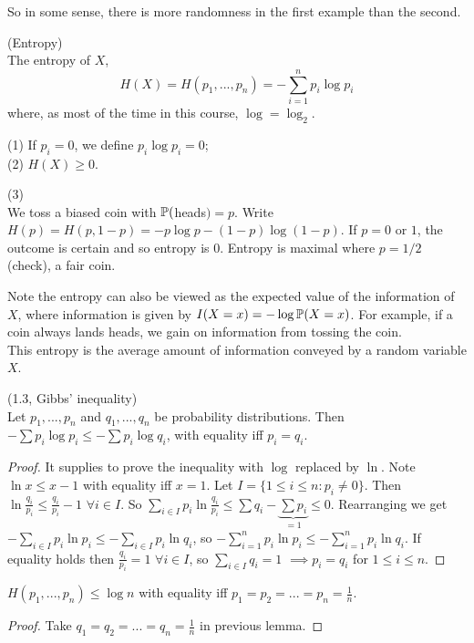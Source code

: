 \documentclass[a4paper]{article}
\begin{document}
So in some sense, there is more randomness in the first example than the second.

\begin{defi} (Entropy)\\
The entropy of $X$, $$H(X) = H(p_1,...,p_n) = -\sum_{i=1}^n p_i \log p_i$$ where, as most of the time in this course, $\log = \log_2$.
\end{defi}

\begin{rem}
(1) If $p_i = 0$, we define $p_i \log p_i = 0$;\\
(2) $H(X) \geq 0$.
\end{rem}

\begin{eg} (3)\\
We toss a biased coin with $\P($heads$) = p$. Write $H(p) = H(p,1-p) = -p\log p - (1-p)\log(1-p)$. If $p=0$ or $1$, the outcome is certain and so entropy is $0$. Entropy is maximal where $p=1/2$ (check), a fair coin.

Note the entropy can also be viewed as the expected value of the information of $X$, where information is given by $I(X=x) = -\log \P(X=x)$. For example, if a coin always lands heads, we gain on information from tossing the coin.\\
This entropy is the average amount of information conveyed by a random variable $X$.
\end{eg}

\begin{lemma} (1.3, Gibbs' inequality)\\
Let $p_1,...,p_n$ and $q_1,...,q_n$ be probability distributions. Then $-\sum p_i \log p_i \leq -\sum p_i \log q_i$, with equality iff $p_i = q_i$.
\begin{proof}
It supplies to prove the inequality with $\log$ replaced by $\ln$. Note $\ln x \leq x-1$ with equality iff $x=1$. Let $I = \{1 \leq i \leq n: p_i \neq 0\}$. Then $\ln \frac{q_i}{p_i} \leq \frac{q_i}{p_i}-1$ $\forall i \in I$. So $\sum_{i \in I} p_i \ln \frac{q_i}{p_i} \leq \sum q_i - \underbrace{\sum p_i}_{=1} \leq 0$. Rearranging we get $-\sum_{i \in I} p_i \ln p_i \leq -\sum_{i \in I} p_i \ln q_i$, so $-\sum_{i=1}^n p_i \ln p_i \leq -\sum_{i=1}^n p_i \ln q_i$. If equality holds then $\frac{q_i}{p_i} = 1$ $\forall i \in I$, so $\sum_{i \in I} q_i = 1$ $\implies p_i = q_i$ for $1 \leq i \leq n$.
\end{proof}
\end{lemma}

\begin{coro}
$H(p_1,...,p_n) \leq \log n$ with equality iff $p_1 = p_2 = ... = p_n =\frac{1}{n}$.
\begin{proof}
Take $q_1=q_2=...=q_n = \frac{1}{n}$ in previous lemma.
\end{proof}
\end{coro}
\end{document}
